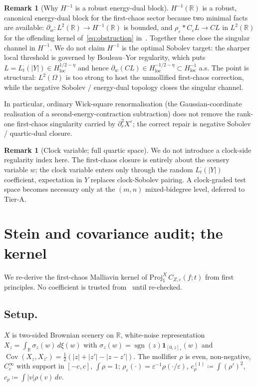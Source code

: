 \documentclass[11pt,reqno]{amsart}
\theoremstyle{plain}
\theoremstyle{definition}
\newtheorem{remark}[theorem]{Remark}
\theoremstyle{remark}
\newcommand{\R}{\mathbb{R}}
\newcommand{\IBM}{Z}
\DeclareMathOperator{\Cov}{Cov}
\DeclareMathOperator{\sgn}{sgn}
\begin{document}
\begin{remark}[Why \texorpdfstring{$H^{-1}$}{H\textasciicircum-1} is a robust energy-dual block]\label{rem:why-Hminus1}
$H^{-1}(\R)$ is a robust, canonical energy-dual block for the
first-chaos sector because two minimal facts are available:
$\partial_{w}\colon L^{2}(\R)\to H^{-1}(\R)$ is bounded, and
$\rho_{\varepsilon}*C_{\varepsilon}L\to CL$ in $L^{2}(\R)$ for the
offending kernel of~\eqref{eq:obstruction}
in~\cite{Fontes-EnergyFirst}. Together these close the singular
channel in $H^{-1}$. We do not claim $H^{-1}$ is the optimal Sobolev
target: the sharper local threshold is governed by
Bouleau--Yor regularity, which puts $L=L_{t}^{\cdot}(|Y|)\in H^{1/2-\eta}_{\mathrm{loc}}$
and hence $\partial_{w}(CL)\in H^{-1/2-\eta}_{\mathrm{loc}}\subset H^{-1}_{\mathrm{loc}}$
a.s. The point is structural: $L^{2}(\Omega)$ is too strong to host
the unmollified first-chaos correction, while the negative
Sobolev / energy-dual topology closes the singular channel.

In particular, ordinary Wick-square renormalisation
(the Gaussian-coordinate realisation of a second-energy-contraction
subtraction) does not remove the rank-one first-chaos singularity
carried by $\partial_{r}^{2}X^{\varepsilon}$; the correct repair is
negative Sobolev / quartic-dual closure.
\end{remark}

\begin{remark}[Clock variable; full quartic space]
We do not introduce a clock-side regularity index here. The
first-chaos closure is entirely about the scenery variable $w$; the
clock variable enters only through the random $L_{t}^{\cdot}(|Y|)$
coefficient, expectation in $Y$ replaces clock-Sobolev pairing. A
clock-graded test space becomes necessary only at the $(m,n)$
mixed-bidegree level, deferred to Tier-A.
\end{remark}

\section{Stein and covariance audit; the kernel}\label{sec:audit}

We re-derive the first-chaos Malliavin kernel of
$\mathrm{Proj}_{1}^{X}\,C_{\IBM,\varepsilon}(f;t)$ from first
principles. No coefficient is trusted from~\cite{Fontes-EnergyFirst}
until re-checked.

\subsection*{Setup.}
$X$ is two-sided Brownian scenery on $\R$, white-noise representation
$X_{z}=\int_{\R}\sigma_{z}(w)\,d\xi(w)$ with
$\sigma_{z}(w)=\sgn(z)\mathbf 1_{[0,z]_{*}}(w)$ and
$\Cov(X_{z},X_{z'})=\tfrac12(|z|+|z'|-|z-z'|)$. The mollifier $\rho$
is even, non-negative, $C_{c}^{\infty}$ with support in $[-c,c]$,
$\int\rho=1$;
$\rho_{\varepsilon}(\cdot)=\varepsilon^{-1}\rho(\cdot/\varepsilon)$,
$c_{\rho}^{(1)}\coloneqq\int(\rho')^{2}$,
$c_{\rho}\coloneqq\int|v|\rho(v)\,dv$.
\end{document}
